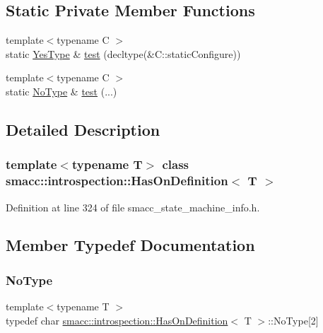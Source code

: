 \subsection*{Static Private Member Functions}
\begin{DoxyCompactItemize}
\item 
{\footnotesize template$<$typename C $>$ }\\static \hyperlink{classsmacc_1_1introspection_1_1HasOnDefinition_ad18cda8f47c5a0e9660b7c7ca54d98c7}{Yes\+Type} \& \hyperlink{classsmacc_1_1introspection_1_1HasOnDefinition_a9271922a017eed3dc8d9ef931239ca3d}{test} (decltype(\&C\+::static\+Configure))
\item 
{\footnotesize template$<$typename C $>$ }\\static \hyperlink{classsmacc_1_1introspection_1_1HasOnDefinition_ab6416d52a925d6a0ce9204897191692e}{No\+Type} \& \hyperlink{classsmacc_1_1introspection_1_1HasOnDefinition_a22cbbab4a5ce8f1b85cfd98a374f7f49}{test} (...)
\end{DoxyCompactItemize}


\subsection{Detailed Description}
\subsubsection*{template$<$typename T$>$\newline
class smacc\+::introspection\+::\+Has\+On\+Definition$<$ T $>$}



Definition at line 324 of file smacc\+\_\+state\+\_\+machine\+\_\+info.\+h.



\subsection{Member Typedef Documentation}
\mbox{\label{classsmacc_1_1introspection_1_1HasOnDefinition_ab6416d52a925d6a0ce9204897191692e}} 
\subsubsection{\texorpdfstring{No\+Type}{NoType}}
{\footnotesize\ttfamily template$<$typename T $>$ \\
typedef char \hyperlink{classsmacc_1_1introspection_1_1HasOnDefinition}{smacc\+::introspection\+::\+Has\+On\+Definition}$<$ T $>$\+::No\+Type\mbox{[}2\mbox{]}\hspace{0.3cm}{\ttfamily [private]}}



